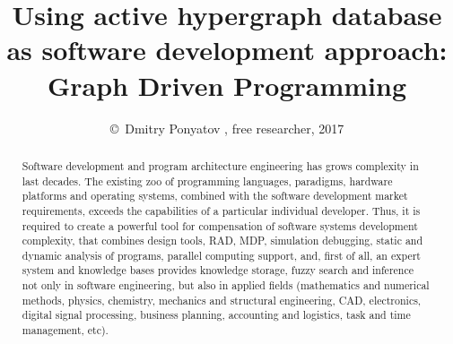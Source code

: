 \documentclass[oneside,12pt]{article}
\title{Using active hypergraph database\\as software development approach:\\\Huge{Graph Driven Programming}}
\author{\copyright\ Dmitry Ponyatov \email{dponyatov@gmail.com}, free researcher, 2017}
\begin{document}
\maketitle

\begin{abstract}\noindent
Software development and program architecture engineering has grows complexity in last decades. The existing zoo of programming languages, paradigms, hardware platforms and operating systems, combined with the software development market requirements, exceeds the capabilities of a particular individual developer. Thus, it is required to create a powerful tool for compensation of software systems development complexity, that combines design tools, RAD, MDP, simulation debugging, static and dynamic analysis of programs, parallel computing support, and, first of all, an expert system and knowledge bases provides knowledge storage, fuzzy search and inference not only in software engineering, but also in applied fields (mathematics and numerical methods, physics, chemistry, mechanics and structural engineering, CAD, electronics, digital signal processing, business planning, accounting and logistics, task and time management, etc).
\end{abstract}
\end{document}

